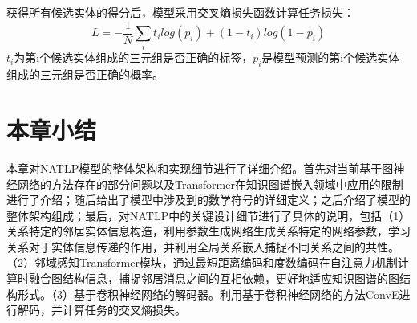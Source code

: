 获得所有候选实体的得分后，模型采用交叉熵损失函数计算任务损失：
\begin{equation}
  L = -\frac{1}{N}\sum\limits_{i}t_ilog(p_i)+(1-t_i)log(1-p_i)
\end{equation}
$t_i$为第i个候选实体组成的三元组是否正确的标签，$p_i$是模型预测的第i个候选实体组成的三元组是否正确的概率。


\section{本章小结}

本章对NATLP模型的整体架构和实现细节进行了详细介绍。首先对当前基于图神经网络的方法存在的部分问题以及Transformer在知识图谱嵌入领域中应用的限制进行了介绍；随后给出了模型中涉及到的数学符号的详细定义；之后介绍了模型的整体架构组成；最后，对NATLP中的关键设计细节进行了具体的说明，包括（1）关系特定的邻居实体信息构造，利用参数生成网络生成关系特定的网络参数，学习关系对于实体信息传递的作用，并利用全局关系嵌入捕捉不同关系之间的共性。（2）邻域感知Transformer模块，通过最短距离编码和度数编码在自注意力机制计算时融合图结构信息，捕捉邻居消息之间的互相依赖，更好地适应知识图谱的图结构形式。（3）基于卷积神经网络的解码器。利用基于卷积神经网络的方法ConvE进行解码，并计算任务的交叉熵损失。